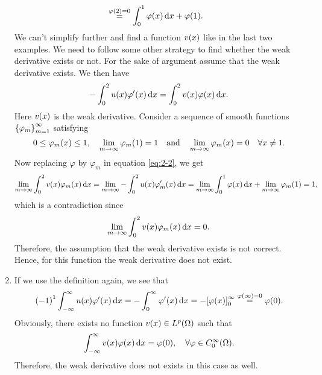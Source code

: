\documentclass[english]{exercise}
\begin{document}
\begin{enumerate}
\begin{align*}
			&\stackrel{\varphi\parentheses*{2} = 0}{=} \int_0^1 \varphi\parentheses*{x}\d x + \varphi\parentheses*{1}.
		\end{align*}
		We can't simplify further and find a function \(v\parentheses*{x}\) like in the last two examples.
		We need to follow some other strategy to find whether the weak derivative exists or not.
		For the sake of argument assume that the weak derivative exists.
		We then have
		\begin{equation}\label{eq:2-2}
			-\int_0^2 u\parentheses*{x}\varphi'\parentheses*{x}\d x = \int_0^2 v\parentheses*{x}\varphi\parentheses*{x}\d x.
		\end{equation}
		Here \(v\parentheses*{x}\) is the weak derivative.
		Consider a sequence of smooth functions \(\braces*{\varphi_m}_{m = 1}^\infty\) satisfying
		\[
			0 \le \varphi_m\parentheses*{x} \le 1, \quad \lim_{m \to \infty}\varphi_m\parentheses*{1} = 1 \quad \text{and} \quad \lim_{m \to \infty}\varphi_m\parentheses*{x} = 0 \quad \forall x \ne 1.
		\]
		Now replacing \(\varphi\) by \(\varphi_m\) in equation \eqref{eq:2-2}, we get
		\[
			\lim_{m \to \infty}\int_0^2 v\parentheses*{x}\varphi_m\parentheses*{x}\d x = \lim_{m \to \infty}-\int_0^2 u\parentheses*{x}\varphi_m'\parentheses*{x}\d x = \lim_{m \to \infty}\int_0^1 \varphi\parentheses*{x}\d x + \lim_{m \to \infty}\varphi_m\parentheses*{1} = 1,
		\]
		which is a contradiction since
		\[
			\lim_{m \to \infty}\int_0^2 v\parentheses*{x}\varphi_m\parentheses*{x}\d x = 0.
		\]
		Therefore, the assumption that the weak derivative exists is not correct.
		Hence, for this function the weak derivative does not exist.
		\item If we use the definition again, we see that
		\[
			\parentheses*{-1}^1 \int_{-\infty}^\infty u\parentheses*{x}\varphi'\parentheses*{x}\d x = -\int_0^\infty \varphi'\parentheses*{x}\d x = -\brackets*{\varphi\parentheses*{x}}_0^\infty \stackrel{\varphi\parentheses*{\infty} = 0}{=} \varphi\parentheses*{0}.
		\]
		Obviously, there exists no function \(v\parentheses*{x} \in L^p\parentheses*{\Omega}\) such that
		\[
			\int_{-\infty}^\infty v\parentheses*{x}\varphi\parentheses*{x}\d x = \varphi\parentheses*{0}, \quad \forall\varphi \in C_0^\infty\parentheses*{\Omega}.
		\]
		Therefore, the weak derivative does not exists in this case as well.
	\end{enumerate}


	\section{}
\end{document}

